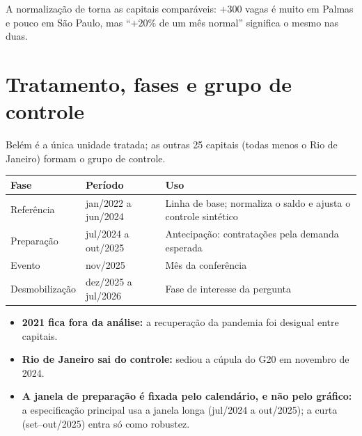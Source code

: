 A normalização de  torna as capitais comparáveis: $+300$ vagas é muito em Palmas e
pouco em São Paulo, mas ``$+20\%$ de um mês normal'' significa o mesmo nas duas.


\section{Tratamento, fases e grupo de controle}\label{sec:fases}

Belém é a única unidade tratada; as outras 25 capitais (todas menos o Rio de Janeiro) formam o grupo
de controle.

\begin{table}[H]
\centering\small
\begin{tabularx}{\linewidth}{p{3cm}p{3.6cm}L}
\toprule
\textbf{Fase} & \textbf{Período} & \textbf{Uso}\\
\midrule
Referência & jan/2022 a jun/2024 & Linha de base; normaliza o saldo e ajusta o controle sintético\\
Preparação & jul/2024 a out/2025 & Antecipação: contratações pela demanda esperada\\
Evento & nov/2025 & Mês da conferência\\
Desmobilização & dez/2025 a jul/2026 & Fase de interesse da pergunta\\
\bottomrule
\end{tabularx}
\end{table}

\begin{itemize}
  \item \textbf{2021 fica fora da análise:} a recuperação da pandemia foi desigual entre capitais.
  \item \textbf{Rio de Janeiro sai do controle:} sediou a cúpula do G20 em novembro de 2024.
  \item \textbf{A janela de preparação é fixada pelo calendário, e não pelo gráfico:} a especificação
        principal usa a janela longa (jul/2024 a out/2025); a curta (set--out/2025) entra só como robustez.
\end{itemize}

